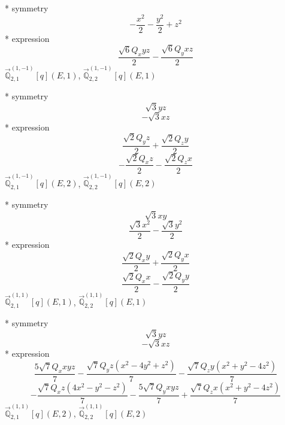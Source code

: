 \documentclass[fleqn,8pt]{jsarticle}
\begin{document}
\noindent\quad ** symmetry
\begin{dmath*}
- \frac{x^{2}}{2} - \frac{y^{2}}{2} + z^{2}
\end{dmath*}
\noindent\quad ** expression
\begin{dmath*}
\frac{\sqrt{6} Q_{x} y z}{2} - \frac{\sqrt{6} Q_{y} x z}{2}
\end{dmath*}
\noindent\quad $\vec{\mathbb{Q}}_{2,1}^{(1,-1)}[q](E,1)$, $\vec{\mathbb{Q}}_{2,2}^{(1,-1)}[q](E,1)$

\noindent\quad ** symmetry
\begin{dmath*}
\sqrt{3} y z
\end{dmath*}
\begin{dmath*}
- \sqrt{3} x z
\end{dmath*}
\noindent\quad ** expression
\begin{dmath*}
\frac{\sqrt{2} Q_{y} z}{2} + \frac{\sqrt{2} Q_{z} y}{2}
\end{dmath*}
\begin{dmath*}
- \frac{\sqrt{2} Q_{x} z}{2} - \frac{\sqrt{2} Q_{z} x}{2}
\end{dmath*}
\noindent\quad $\vec{\mathbb{Q}}_{2,1}^{(1,-1)}[q](E,2)$, $\vec{\mathbb{Q}}_{2,2}^{(1,-1)}[q](E,2)$

\noindent\quad ** symmetry
\begin{dmath*}
\sqrt{3} x y
\end{dmath*}
\begin{dmath*}
\frac{\sqrt{3} x^{2}}{2} - \frac{\sqrt{3} y^{2}}{2}
\end{dmath*}
\noindent\quad ** expression
\begin{dmath*}
\frac{\sqrt{2} Q_{x} y}{2} + \frac{\sqrt{2} Q_{y} x}{2}
\end{dmath*}
\begin{dmath*}
\frac{\sqrt{2} Q_{x} x}{2} - \frac{\sqrt{2} Q_{y} y}{2}
\end{dmath*}
\noindent\quad $\vec{\mathbb{Q}}_{2,1}^{(1,1)}[q](E,1)$, $\vec{\mathbb{Q}}_{2,2}^{(1,1)}[q](E,1)$

\noindent\quad ** symmetry
\begin{dmath*}
\sqrt{3} y z
\end{dmath*}
\begin{dmath*}
- \sqrt{3} x z
\end{dmath*}
\noindent\quad ** expression
\begin{dmath*}
\frac{5 \sqrt{7} Q_{x} x y z}{7} - \frac{\sqrt{7} Q_{y} z \left(x^{2} - 4 y^{2} + z^{2}\right)}{7} - \frac{\sqrt{7} Q_{z} y \left(x^{2} + y^{2} - 4 z^{2}\right)}{7}
\end{dmath*}
\begin{dmath*}
- \frac{\sqrt{7} Q_{x} z \left(4 x^{2} - y^{2} - z^{2}\right)}{7} - \frac{5 \sqrt{7} Q_{y} x y z}{7} + \frac{\sqrt{7} Q_{z} x \left(x^{2} + y^{2} - 4 z^{2}\right)}{7}
\end{dmath*}
\noindent\quad $\vec{\mathbb{Q}}_{2,1}^{(1,1)}[q](E,2)$, $\vec{\mathbb{Q}}_{2,2}^{(1,1)}[q](E,2)$
\end{document}
